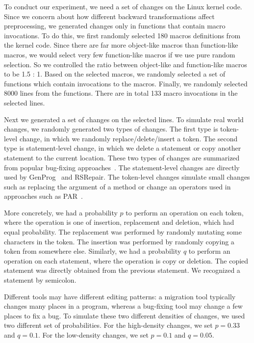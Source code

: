 To conduct our experiment, we need a set of changes on the Linux
kernel code. Since we concern about how different backward
transformations affect preprocessing, we generated changes only in functions that
contain macro invocations. To do this, we first randomly selected 180 macros
definitions from the kernel code. Since there are far more object-like
macros than function-like macros, we
would select very few function-like macros if we use pure random selection. So we controlled the ratio
between object-like and function-like macros to be 1.5 : 1. Based on
the selected macros, we randomly selected a set of functions which contain
invocations to the macros. Finally, we randomly selected 8000 lines from
the functions. There are in total 133 macro invocations in the
selected lines.

Next we generated a set of changes on the selected lines. To simulate real
world changes, we randomly generated two types of changes. The first
type is token-level change, in which we randomly replace/delete/insert
a token. The second type is statement-level change, in which we delete
a statement or copy another statement to the current location. These
two types of changes are summarized from popular bug-fixing
approaches~\cite{le2012genprog,QiMLDW14,kim2013automatic}. The statement-level changes are directly used by GenProg~\cite{le2012genprog} and
RSRepair\cite{QiMLDW14}. The token-level changes simulate small changes such as
replacing the argument of a method or change an operators used in
approaches such as PAR~\cite{kim2013automatic}.

More concretely, we had a probability $p$ to perform an operation on
each token, where the operation is one of insertion, replacement and
deletion, which had equal probability. The replacement was performed
by randomly mutating some characters in the token. The insertion was
performed by randomly copying a token from somewhere else. Similarly,
we had a probability $q$ to perform an operation on each statement,
where the operation is copy or deletion. The copied statement was
directly obtained from the previous statement. We recognized a
statement by semicolon.

Different tools may have different editing patterns:
a migration tool typically changes many places in a program, whereas a
bug-fixing tool may change a few places to fix a bug. To simulate these two different
densities of changes, we used two different set of probabilities. For
the high-density changes, we set $p=0.33$ and $q=0.1$. For
the low-density changes, we set $p=0.1$ and $q=0.05$.


